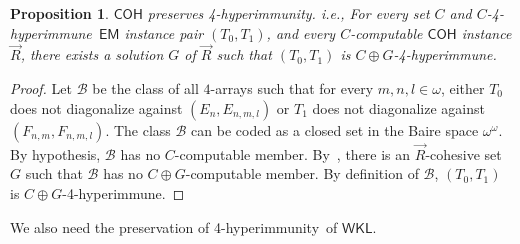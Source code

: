 \documentclass{amsart}
\newtheorem{proposition}[theorem]{Proposition}
\theoremstyle{definition}
\theoremstyle{remark}
\numberwithin{equation}{section}
\theoremstyle{noparens}
\def\msf{\mathsf}
\newcommand{\Bcal}{\mathcal{B}}
\def\iatfshyp{4-hyperimmune}
\def\propiatfshyp{4-hyperimmunity}
\begin{document}
\begin{proposition}\label{uemprop0}
$\msf{COH}$ preserves \propiatfshyp. i.e.,
For every set $C$ and $C$-\iatfshyp\ $\msf{EM}$
instance pair $(T_0,T_1)$,  and every $C$-computable $\msf{COH}$
instance $\vec{R}$, there exists a solution $G$ of $\vec{R}$ such that
$(T_0,T_1)$ is $C\oplus G$-\iatfshyp.
\end{proposition}
\begin{proof}
Let $\Bcal$ be the class of all $4$-arrays such that for every $m, n, l \in \omega$, either  $T_0$ does not diagonalize against  $(E_{n},E_{n,m,l} )$ or
 $T_1$ does not diagonalize against $(F_{n,m},F_{n,m,l})$. The class $\Bcal$ can be coded as a closed set in the Baire space $\omega^\omega$. By hypothesis, $\Bcal$ has no $C$-computable member.
 By~\cite[Corollary 2.9]{PateyCombinatorial},
there is an $\vec{R}$-cohesive set~$G$ such that $\Bcal$ has no $C \oplus G$-computable member.
By definition of $\Bcal$, $(T_0,T_1)$ is $C\oplus G$-\iatfshyp.
\end{proof}

We also need the preservation of \propiatfshyp\ of $\msf{WKL}$.
\end{document}
